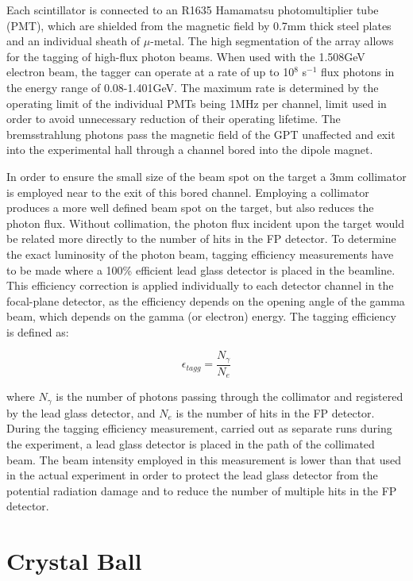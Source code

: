 \indent Each scintillator is connected to an R1635 Hamamatsu photomultiplier tube (PMT), which are shielded from the magnetic field by 0.7mm thick steel plates and an individual sheath of $\mu$-metal. The high segmentation of the array allows for the tagging of high-flux photon beams. When used with the 1.508GeV electron beam, the tagger can operate at a rate of up to 10$^{8}$ s$^{-1}$ flux photons in the energy range of 0.08-1.401GeV. The maximum rate is determined by the operating limit of the individual PMTs being 1MHz per channel, limit used in order to avoid unnecessary reduction of their operating lifetime. The bremsstrahlung photons pass the magnetic field of the GPT unaffected and exit into the experimental hall through a channel bored into the dipole magnet.

\indent In order to ensure the small size of the beam spot on the target a 3mm collimator is employed near to the exit of this bored channel. Employing a collimator produces a more well defined beam spot on the target, but also reduces the photon flux.  Without collimation, the photon flux incident upon the target would be related more directly to the number of hits in the FP detector. To determine the exact luminosity of the photon beam, tagging efficiency measurements have to be made where a 100\% efficient lead glass detector is placed in the beamline.  This efficiency correction is applied individually to each detector channel in the focal-plane detector, as the efficiency depends on the opening angle of the gamma beam, which depends on the gamma (or electron) energy. The tagging efficiency is defined as:

\begin{equation}
\epsilon_{tagg}=\frac{N_{\gamma}}{N_{e}}
\end{equation}

\indent where $N_{\gamma}$ is the number of photons passing through the collimator and registered by the lead glass detector, and $N_{e}$ is the number of hits in the FP detector. During the tagging efficiency measurement, carried out as separate runs during the experiment, a lead glass detector is placed in the path of the collimated beam. The beam intensity employed in this measurement is lower than that used in the actual experiment in order to protect the lead glass detector from the potential radiation damage and to reduce the number of multiple hits in the FP detector.

\section{Crystal Ball}

